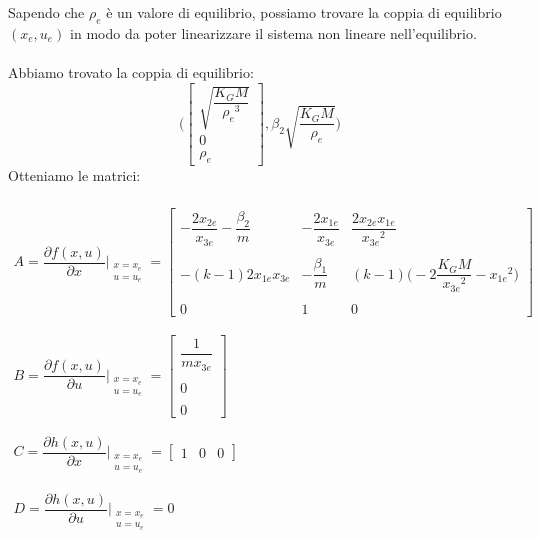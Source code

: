     Sapendo che \(\rho_e\) è un valore di equilibrio, possiamo trovare la coppia di 
    equilibrio \((x_e,u_e)\)  in modo da poter linearizzare il sistema non lineare nell'equilibrio.\\\\
    Abbiamo trovato la coppia di equilibrio:
    \begin{equation*}
        \Biggl(
            \begin{bmatrix}
                \sqrt{\dfrac{K_GM}{{\rho_e}^3}}\\
                0\\
                \rho_e
            \end{bmatrix},
            \beta_2\sqrt{\dfrac{K_GM}{{\rho_e}}}
        \Biggr)
    \end{equation*}
    \clearpage
    Otteniamo le matrici:\\\\
    \begin{equation}
        \begin{array}{l}
            A=\dfrac{\partial f(x,u)}{\partial x}\Biggl\vert_{\substack{x=x_e\\ u=u_e}}=
            \begin{bmatrix}
                -\dfrac{2x_{2e}}{x_{3e}}-\dfrac{\beta_2}{m} & -\dfrac{2x_{1e}}{x_{3e}} & \dfrac{2x_{2e}x_{1e}}{{x_{3e}}^2}\\\\
                -(k-1)2x_{1e}x_{3e} & -\dfrac{\beta_1}{m}    &   (k-1)\biggl(-2\dfrac{K_GM}{{x_{3e}}^2}-{x_{1e}}^2\biggr)\\\\
                0   &  1    &    0
            \end{bmatrix} \\\\\\
            B=\dfrac{\partial f(x,u)}{\partial u}\Biggl\vert_{\substack{x=x_e\\ u=u_e}}=
            \begin{bmatrix}
                \dfrac{1}{mx_{3e}}\\\\
                0\\\\
                0
            \end{bmatrix}\\\\\\
            C=\dfrac{\partial h(x,u)}{\partial x}\Biggl\vert_{\substack{x=x_e\\ u=u_e}}=
            \begin{bmatrix}
                1&0&0
            \end{bmatrix}\\\\\\
            D=\dfrac{\partial h(x,u)}{\partial u}\Biggl\vert_{\substack{x=x_e\\ u=u_e}}=0
        \end{array}
    \end{equation}

